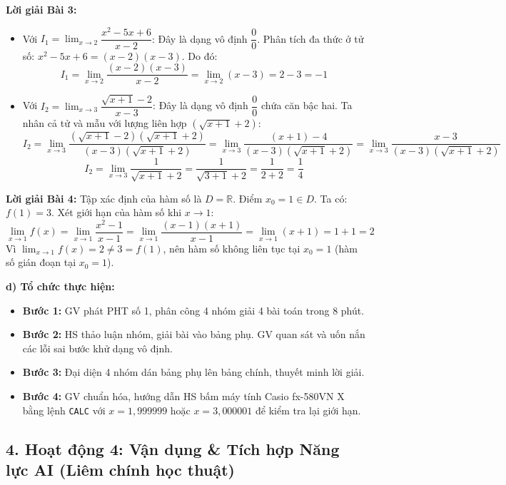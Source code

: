 \documentclass[12pt, a4paper]{article}
\begin{document}
\noindent \textbf{Lời giải Bài 3:}
\begin{itemize}
    \item Với $I_1 = \lim_{x \to 2} \dfrac{x^2 - 5x + 6}{x - 2}$:
    Đây là dạng vô định $\dfrac{0}{0}$. Phân tích đa thức ở tử số: $x^2 - 5x + 6 = (x - 2)(x - 3)$.
    Do đó:
    $$I_1 = \lim_{x \to 2} \dfrac{(x - 2)(x - 3)}{x - 2} = \lim_{x \to 2} (x - 3) = 2 - 3 = -1$$
    \item Với $I_2 = \lim_{x \to 3} \dfrac{\sqrt{x+1} - 2}{x - 3}$:
    Đây là dạng vô định $\dfrac{0}{0}$ chứa căn bậc hai. Ta nhân cả tử và mẫu với lượng liên hợp $(\sqrt{x+1} + 2)$:
    $$I_2 = \lim_{x \to 3} \dfrac{(\sqrt{x+1} - 2)(\sqrt{x+1} + 2)}{(x - 3)(\sqrt{x+1} + 2)} = \lim_{x \to 3} \dfrac{(x+1) - 4}{(x - 3)(\sqrt{x+1} + 2)} = \lim_{x \to 3} \dfrac{x - 3}{(x - 3)(\sqrt{x+1} + 2)}$$
    $$I_2 = \lim_{x \to 3} \dfrac{1}{\sqrt{x+1} + 2} = \dfrac{1}{\sqrt{3+1} + 2} = \dfrac{1}{2 + 2} = \dfrac{1}{4}$$
\end{itemize}

\noindent \textbf{Lời giải Bài 4:}
Tập xác định của hàm số là $D = \mathbb{R}$. Điểm $x_0 = 1 \in D$.
Ta có: $f(1) = 3$.
Xét giới hạn của hàm số khi $x \to 1$:
$$\lim_{x \to 1} f(x) = \lim_{x \to 1} \dfrac{x^2 - 1}{x - 1} = \lim_{x \to 1} \dfrac{(x - 1)(x + 1)}{x - 1} = \lim_{x \to 1} (x + 1) = 1 + 1 = 2$$
Vì $\lim_{x \to 1} f(x) = 2 \neq 3 = f(1)$, nên hàm số không liên tục tại $x_0 = 1$ (hàm số gián đoạn tại $x_0 = 1$).

\noindent \textbf{d) Tổ chức thực hiện:}
\begin{itemize}
    \item \textbf{Bước 1:} GV phát PHT số 1, phân công 4 nhóm giải 4 bài toán trong 8 phút.
    \item \textbf{Bước 2:} HS thảo luận nhóm, giải bài vào bảng phụ. GV quan sát và uốn nắn các lỗi sai bước khử dạng vô định.
    \item \textbf{Bước 3:} Đại diện 4 nhóm dán bảng phụ lên bảng chính, thuyết minh lời giải.
    \item \textbf{Bước 4:} GV chuẩn hóa, hướng dẫn HS bấm máy tính Casio fx-580VN X bằng lệnh \texttt{CALC} với $x = 1{,}999999$ hoặc $x = 3{,}000001$ để kiểm tra lại giới hạn.
\end{itemize}

\subsection*{4. Hoạt động 4: Vận dụng & Tích hợp Năng lực AI (Liêm chính học thuật)}
\end{document}
